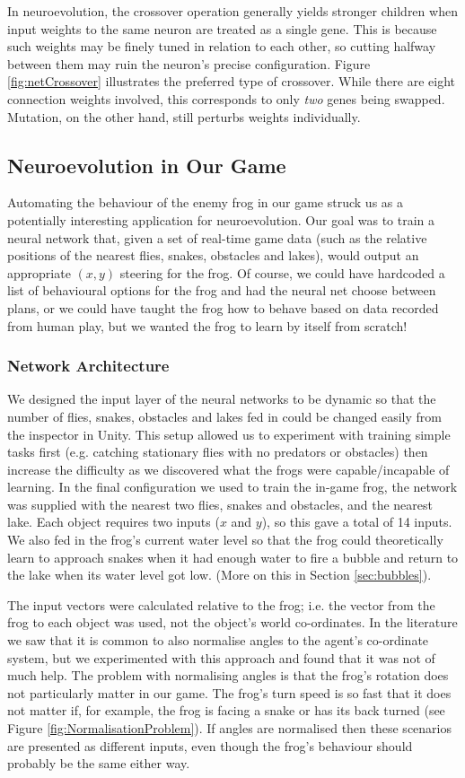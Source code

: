 In neuroevolution, the crossover operation generally yields stronger children when input weights to the same neuron are treated as a single gene. This is because such weights may be finely tuned in relation to each other, so cutting halfway between them may ruin the neuron's precise configuration. Figure \ref{fig:netCrossover} illustrates the preferred type of crossover. While there are eight connection weights involved, this corresponds to only \textit{two} genes being swapped. Mutation, on the other hand, still perturbs weights individually.

\subsection{Neuroevolution in Our Game}
Automating the behaviour of the enemy frog in our game struck us as a potentially interesting application for neuroevolution. Our goal was to train a neural network that, given a set of real-time game data (such as the relative positions of the nearest flies, snakes, obstacles and lakes), would output an appropriate $(x, y)$ steering for the frog. Of course, we could have hardcoded a list of behavioural options for the frog and had the neural net choose between plans, or we could have taught the frog how to behave based on data recorded from human play, but we wanted the frog to learn by itself from scratch!

\subsubsection{Network Architecture}
\noindent We designed the input layer of the neural networks to be dynamic so that the number of flies, snakes, obstacles and lakes fed in could be changed easily from the inspector in Unity. This setup allowed us to experiment with training simple tasks first (e.g. catching stationary flies with no predators or obstacles) then increase the difficulty as we discovered what the frogs were capable/incapable of learning. In the final configuration we used to train the in-game frog, the network was supplied with the nearest two flies, snakes and obstacles, and the nearest lake. Each object requires two inputs ($x$ and $y$), so this gave a total of 14 inputs. We also fed in the frog's current water level so that the frog could theoretically learn to approach snakes when it had enough water to fire a bubble and return to the lake when its water level got low. (More on this in Section \ref{sec:bubbles}).

The input vectors were calculated relative to the frog; i.e. the vector from the frog to each object was used, not the object's world co-ordinates. In the literature we saw that it is common to also normalise angles to the agent's co-ordinate system, but we experimented with this approach and found that it was not of much help. The problem with normalising angles is that the frog's rotation does not particularly matter in our game. The frog's turn speed is so fast that it does not matter if, for example, the frog is facing a snake or has its back turned (see Figure \ref{fig:NormalisationProblem}). If angles are normalised then these scenarios are presented as different inputs, even though the frog's behaviour should probably be the same either way.

